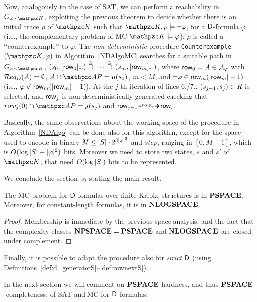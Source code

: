 Now, analogously to the case of SAT,
we can perform a reachability in $G_{\varphi\sim\Ku}$, exploiting the previous theorem
to decide whether there is an initial trace $\rho$ of $\Ku$ such that $\Ku,\rho\models\neg\varphi$, for a $\mathsf{D}$-formula $\varphi$ (i.e., the complementary problem of MC $\Ku\models\varphi$); $\rho$ is called a \lq\lq counterexample\rq\rq{} to $\varphi$.
%
The \emph{non-deterministic} procedure \texttt{Counterexample}$(\Ku,\varphi)$ in Algorithm~\ref{NDAlgoMC} 
searches for a suitable path in $G_{\varphi \sim\Ku}$,  $(s_0,[\text{{\sffamily row}}_0]_\sim) \stackrel{\Xi}{\rightarrow} \cdots \stackrel{\Xi}{\rightarrow} (s_m,[\text{{\sffamily row}}_{m}]_\sim)$, where $\text{{\sffamily row}}_0 =A\in \mathcal{A}_{\varphi}$ with  $\mathcal{R} eq_D(A)=\emptyset$, $A\cap\AP=\mu(\sinit)$, $m< M$, and $\neg\varphi\in \text{{\sffamily row}}_m(|\text{{\sffamily row}}_m|-1)$ (i.e., $\varphi\not\in \text{{\sffamily row}}_m(|\text{{\sffamily row}}_m|-1)$). At the $j$-th iteration of lines 6./7., $(s_{j-1},s_j)\in\textit{R}$ is selected, and $\text{{\sffamily row}}_{j}$ is non-deterministically generated checking that $row_j(0)\cap\AP=\mu(s_j)$ and $\row_{j-1}\rownext\row_{j}$.

Basically, the same observations about the working space of the procedure in Algorithm~\ref{NDAlgo} can be done also for this algorithm, except for the space used to encode in binary $M\leq |S|\cdot 2^{3|\varphi|^2}$ and $step$, ranging in $[0,M-1]$, which is $O(\log|S| + |\varphi|^2)$ bits. Moreover we need to store two states, $s$ and $s'$ of $\Ku$, that need $O(\log |S|)$ bits to be represented.

We conclude the section by stating the main result.
\begin{theorem}\label{thm:pspaceMC}
The MC problem for $\mathsf{D}$ formulas over finite Kripke structures is in $\textbf{PSPACE}$. Moreover, for constant-length formulas, it is in $\textbf{NLOGSPACE}$.
\end{theorem} 
\begin{proof}
Membership is immediate by the previous space analysis, and the fact that the complexity classes $\textbf{NPSPACE}=\textbf{PSPACE}$ and $\textbf{NLOGSPACE}$ are closed under complement.
\end{proof}
%
Finally, it is possible to adapt the procedure also for \emph{strict} $\mathsf{D}${} (using Definitions~\ref{def:d_generatorS}--\ref{def:rownextS}). 

In the next section we will 
comment on $\textbf{PSPACE}$-hardness, and thus $\textbf{PSPACE}$-completeness, of SAT and MC for $\mathsf{D}$ formulas.